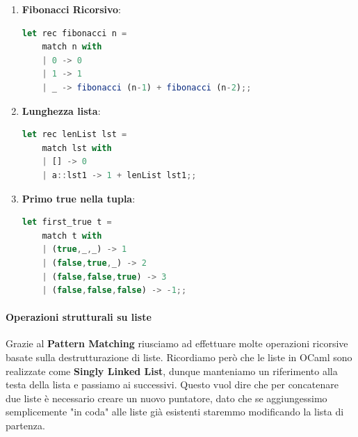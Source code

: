 \documentclass{article}
\begin{document}
\begin{enumerate}

\item \textbf{Fibonacci Ricorsivo}:

\vspace*{10px}
\begin{lstlisting}[language = JavaScript]
let rec fibonacci n =
    match n with
    | 0 -> 0
    | 1 -> 1
    | _ -> fibonacci (n-1) + fibonacci (n-2);;
\end{lstlisting}

\vspace*{-20px}

\item \textbf{Lunghezza lista}:

\vspace*{10px}
\begin{lstlisting}[language = JavaScript]
let rec lenList lst =
    match lst with
    | [] -> 0
    | a::lst1 -> 1 + lenList lst1;;
\end{lstlisting}

\vspace*{-20px}

\item \textbf{Primo true nella tupla}:

\vspace*{10px}
\begin{lstlisting}[language = JavaScript]
let first_true t =
    match t with
    | (true,_,_) -> 1
    | (false,true,_) -> 2
    | (false,false,true) -> 3
    | (false,false,false) -> -1;;
\end{lstlisting}

\vspace*{-20px}

\end{enumerate}

\paragraph{Operazioni strutturali su liste}

Grazie al \textbf{Pattern Matching} riusciamo ad effettuare molte operazioni ricorsive basate sulla destrutturazione di liste. Ricordiamo però che le liste in OCaml sono realizzate come \textbf{Singly Linked List}, dunque manteniamo un riferimento alla testa della lista e passiamo ai successivi. Questo vuol dire che per concatenare due liste è necessario creare un nuovo puntatore, dato che se aggiungessimo semplicemente "in coda" alle liste già esistenti staremmo modificando la lista di partenza.
\end{document}
